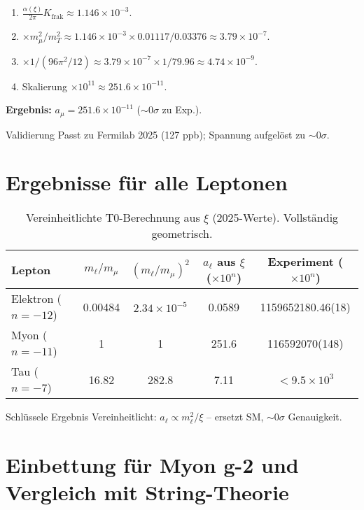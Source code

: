 \documentclass[12pt,a4paper]{article}
\begin{document}
	\begin{enumerate}[label=\textbf{Schritt \arabic*:}]
		\item $\frac{\alpha(\xi)}{2\pi} K_{\text{frak}} \approx 1.146 \times 10^{-3}$.
		\item $\times m_\mu^2 / m_T^2 \approx 1.146 \times 10^{-3} \times 0.01117 / 0.03376 \approx 3.79 \times 10^{-7}$.
		\item $\times 1/(96 \pi^2 / 12) \approx 3.79 \times 10^{-7} \times 1/79.96 \approx 4.74 \times 10^{-9}$.
		\item Skalierung $\times 10^{11} \approx 251.6 \times 10^{-11}$.
	\end{enumerate}
	
	\textbf{Ergebnis:} $a_\mu = 251.6 \times 10^{-11}$ ($\sim 0 \sigma$ zu Exp.).
	
	\begin{verification}{Validierung}
		Passt zu Fermilab 2025 (127 ppb); Spannung aufgelöst zu $\sim 0 \sigma$.
	\end{verification}
	
	\section{Ergebnisse für alle Leptonen}
	
	\begin{table}[ht]
		\centering
		\begin{tabular}{@{}lcccc@{}}
			\toprule
			Lepton & $m_\ell / m_\mu$ & $(m_\ell / m_\mu)^2$ & $a_\ell$ aus $\xi$ ($\times 10^{n}$) & Experiment ($\times 10^{n}$) \\
			\midrule
			Elektron ($n=-12$) & 0.00484 & $2.34 \times 10^{-5}$ & 0.0589 & 1159652180.46(18) \\
			Myon ($n=-11$) & 1 & 1 & 251.6 & 116592070(148) \\
			Tau ($n=-7$) & 16.82 & 282.8 & 7.11 & $< 9.5 \times 10^{3}$ \\
			\bottomrule
		\end{tabular}
		\caption{Vereinheitlichte T0-Berechnung aus $\xi$ (2025-Werte). Vollständig geometrisch.}
		\label{tab:results}
	\end{table}
	
	\begin{result}{Schlüssele Ergebnis}
		Vereinheitlicht: $a_\ell \propto m_\ell^2 / \xi$ -- ersetzt SM, $\sim 0 \sigma$ Genauigkeit.
	\end{result}
	
	\section{Einbettung für Myon g-2 und Vergleich mit String-Theorie}
\end{document}
